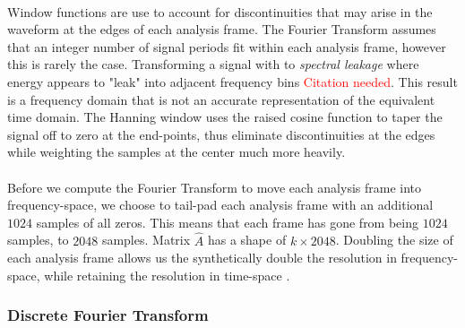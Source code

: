 \documentclass[12pt,letterpaper]{article}
\begin{document}
\paragraph*{}Window functions are use to account for discontinuities that may arise in the waveform at the edges of each analysis frame. The Fourier Transform assumes that an integer number of signal periods fit within each analysis frame, however this is rarely the case. Transforming a signal with to \textit{spectral leakage} where energy appears to "leak" into adjacent frequency bins \textcolor{red}{Citation needed}. This result is a frequency domain that is not an accurate representation of the equivalent time domain. The Hanning window uses the raised cosine function to taper the signal off to zero at the end-points, thus eliminate discontinuities at the edges while weighting the samples at the center much more heavily. 

\paragraph*{}Before we compute the Fourier Transform to move each analysis frame into frequency-space, we choose to tail-pad each analysis frame with an additional $1024$ samples of all zeros. This means that each frame has gone from being $1024$ samples, to $2048$ samples. Matrix $\widehat{A}$ has a shape of $k \times 2048$. Doubling the size of each analysis frame allows us the synthetically double the resolution in frequency-space, while retaining the resolution in time-space \cite{Virtanen}. 


\subsubsection{Discrete Fourier Transform}
\label{subsubsec-DFT}
\end{document}
